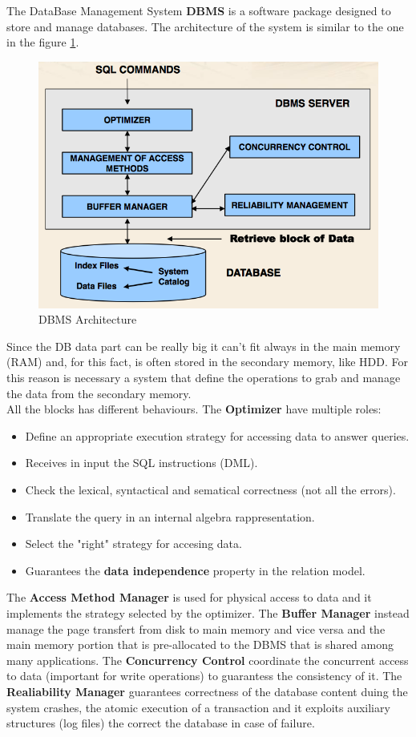 \documentclass[12pt]{article}
\begin{document}
The DataBase Management System \textbf{DBMS} is a software package designed to store and manage databases. The architecture of the system is similar to the one in the figure \ref{fig:arch}.
\begin{figure}[h!]
  \includegraphics[width=\linewidth]{images/arch.png}
  \caption{DBMS Architecture}
  \label{fig:arch}
\end{figure}
Since the DB data part can be really big it can't fit always in the main memory (RAM) and, for this fact, is often stored in the secondary memory, like HDD. For this reason is necessary a system that define the operations to grab and manage the data from the secondary memory.\\
All the blocks has different behaviours. The \textbf{Optimizer} have multiple roles:
\begin{itemize}
  \item Define an appropriate execution strategy for accessing data to answer queries.
  \item Receives in input the SQL instructions (DML).
  \item Check the lexical, syntactical and sematical correctness (not all the errors).
  \item Translate the query in an internal algebra rappresentation.
  \item Select the "right" strategy for accesing data.
  \item Guarantees the \textbf{data independence} property in the relation model.
\end{itemize}
The \textbf{Access Method Manager} is used for physical access to data and it implements the strategy selected by the optimizer. The \textbf{Buffer Manager} instead manage the page transfert from disk to main memory and vice versa and the main memory portion that is pre-allocated to the DBMS that is shared among many applications. The \textbf{Concurrency Control} coordinate the concurrent access to data (important for write operations) to guarantess the consistency of it. The \textbf{Realiability Manager} guarantees correctness of the database content duing the system crashes, the atomic execution of a transaction and it exploits auxiliary structures (log files) the correct the database in case of failure.\\
\end{document}
